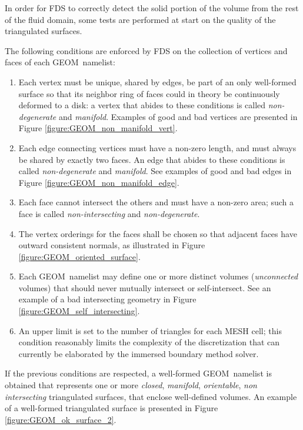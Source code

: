 \documentclass[12pt]{article}
\begin{document}
In order for FDS to correctly detect the solid portion of the volume from the rest
of the fluid domain, some tests are performed at start on the quality of
the triangulated surfaces.

The following conditions are enforced by FDS on the collection of vertices and faces of each {\ct GEOM}\ namelist:

\begin{enumerate}
\item Each vertex must be unique, shared by edges, be part of an only well-formed surface so that its neighbor ring of faces could in theory be continuously deformed to a disk: a vertex that abides to these conditions is called \textit{non-degenerate} and \textit{manifold}. Examples of good and bad vertices are presented in Figure \ref{figure:GEOM_non_manifold_vert}.

\item Each edge connecting vertices must have a non-zero length, and must always be shared by exactly two faces. An edge that abides to these conditions is called \textit{non-degenerate} and \textit{manifold}. See examples of good and bad edges in Figure \ref{figure:GEOM_non_manifold_edge}.

\item Each face cannot intersect the others and must have a non-zero area; such a face is called \textit{non-intersecting} and \textit{non-degenerate}.

\item The vertex orderings for the faces shall be chosen so that adjacent faces
have outward consistent normals, as illustrated in Figure \ref{figure:GEOM_oriented_surface}.

\item Each {\ct GEOM}\ namelist may define one or more distinct volumes (\textit{unconnected} volumes) that should never mutually intersect or self-intersect. See an example of a bad intersecting geometry in Figure \ref{figure:GEOM_self_intersecting}.

\item An upper limit is set to the number of triangles for each {\ct MESH} cell; this condition reasonably limits the complexity of the discretization that can currently be elaborated by the immersed boundary method solver.

\end{enumerate}

If the previous conditions are respected, a well-formed {\ct GEOM}\ namelist is obtained that represents one or more \textit{closed}, \textit{manifold}, \textit{orientable}, \textit{non intersecting} triangulated surfaces, that enclose well-defined volumes. An example of a well-formed triangulated surface is presented in Figure \ref{figure:GEOM_ok_surface_2}.
\end{document}

